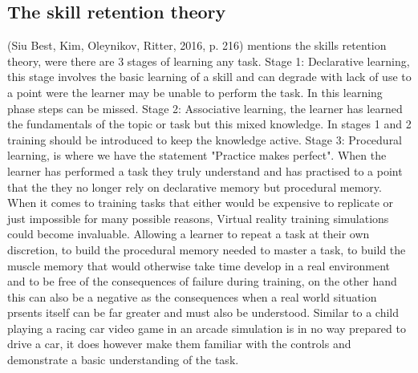 \documentclass[10pt,journal,compsoc]{IEEEtran}
\begin{document}
	\subsection{The skill retention theory}
	(Siu Best, Kim, Oleynikov, Ritter, 2016, p. 216) mentions the skills retention theory, were there are 3 stages of learning any task. Stage  1: Declarative learning, this stage involves the basic learning of a skill and can degrade with lack of use to a point were the learner may be unable to perform the task. In this learning phase steps can be missed. \newline Stage 2: Associative  learning, the learner has learned the fundamentals of the topic or task but this mixed knowledge. In stages 1 and 2 training should be introduced to keep the knowledge active.\newline \newline
	Stage 3: Procedural learning, is where we have the statement "Practice makes perfect". When the learner has performed a task they truly understand and has practised to a point that the they no longer rely on declarative memory but procedural memory. \newline
	When it comes to training tasks that either would be expensive to replicate or just impossible for many possible reasons, Virtual reality training simulations could become invaluable. Allowing a learner to repeat a task at their own discretion, to build the procedural memory needed to master a task, to build the muscle memory that would otherwise take time develop in a real environment and to be free of the consequences of failure during training, on the other hand this can also be a negative as the consequences when a real world situation prsents itself can be far greater and must also be understood. Similar to a child playing a racing car video game in an arcade simulation is in no way prepared to drive a car, it does however make them familiar with the controls and demonstrate a basic understanding of the task.
	
\end{document}
